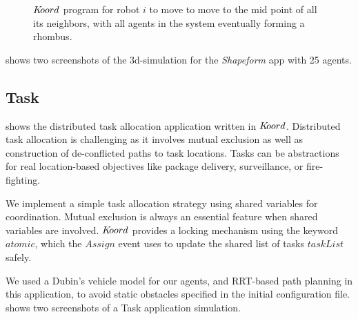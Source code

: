 \begin{figure}[ht!]
\begin{mdframed}
    \noindent
    \begin{center}
        \scriptsize
        {}
        {}
    \end{center}
\end{mdframed}
    \caption{$K\kern-2pt oord$ program for robot $i$ to move to move to the mid point of all its neighbors, with all agents in the system eventually forming a rhombus.}
    \label{fig:squareform}
\end{figure}

 shows two screenshots of the 3d-simulation for the \emph{Shapeform} app with 25 agents. 




\subsection{Task}

  shows the distributed task allocation application written in $K\kern-2pt oord$. Distributed task allocation is challenging as it involves mutual exclusion as well as construction of de-conflicted paths to task locations. Tasks can be abstractions for real location-based objectives like package delivery, surveillance, or fire-fighting. 

We implement a simple task allocation strategy using shared variables for coordination. Mutual exclusion is always an essential feature when shared variables are involved. $K\kern-2pt oord$ provides a locking mechanism using the keyword $\mathit{atomic}$, which the $\mathit{Assign}$ event uses to update the shared list of tasks $\mathit{taskList}$ safely. 

We used a Dubin's vehicle model for our agents, and RRT-based path planning in this application, to avoid static obstacles specified in the initial configuration file.  shows two screenshots of a Task application simulation. 

